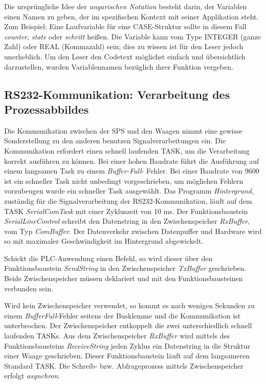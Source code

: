 Die ursprüngliche Idee der \textit{ungarischen Notation} besteht darin, der Variablen einen Namen zu geben, der  im spezifischen Kontext mit seiner Applikation steht. Zum Beispiel: Eine Laufvariable für eine CASE-Struktur sollte in diesem Fall \textit{counter}, \textit{state} oder \textit{schritt} heißen. Die Variable kann vom Type INTEGER (ganze Zahl) oder REAL (Kommazahl) sein; dies zu wissen ist für den Leser jedoch unerheblich. 
Um den Leser den Codetext möglichst einfach und übersichtlich darzustellen, wurden Variablennamen bezüglich ihrer Funktion vergeben.

\subsection{RS232-Kommunikation: Verarbeitung des Prozessabbildes}
\label{subsec:RS-232}

Die Kommunikation zwischen der SPS und den Waagen nimmt eine gewisse Sonderstellung zu den anderen benutzen Signalverarbeitungen ein. Die Kommunikation erfordert einen schnell laufenden TASK, um die Verarbeitung korrekt ausführen zu können. Bei einer hohen Baudrate führt die Ausführung auf einem langsamen Task zu einem \textit{Buffer-Full}- Fehler. Bei einer Baudrate von 9600 ist ein schneller Task nicht unbedingt vorgeschrieben, um möglichen Fehlern vorzubeugen wurde ein schneller Task ausgewählt. Das Programm \textit{Hintergrund}, zuständig für die Signalverarbeitung der RS232-Kommunikation, läuft auf dem TASK \textit{SerialComTask} mit einer Zykluszeit von 10 ms. Der Funktionsbaustein \textit{SerialLineControl} schreibt den Datenstring in den Zwischenspeicher \textit{RxBuffer}, vom Typ \textit{ComBuffer}. Der Datenverkehr zwischen Datenpuffer und Hardware wird so mit maximaler Geschwindigkeit im Hintergrund abgewickelt.

Schickt die PLC-Anwendung einen Befehl, so wird dieser über den Funktionsbaustein \textit{SendString} in den Zwischenspeicher \textit{TxBuffer} geschrieben. Beide Zwischenspeicher müssen deklariert und mit den Funktionsbausteinen verbunden sein. 

Wird kein Zwischenspeicher verwendet, so kommt es nach wenigen Sekunden zu einem \textit{BufferFull}-Fehler seitens der Busklemme und die Kommunikation ist unterbrochen. 
Der Zwischenspeicher entkoppelt die zwei unterschiedlich schnell laufenden TASKs.
Aus dem Zwischenspeicher \textit{RxBuffer} wird mittels des Funktionsbausteins \textit{ReceiveString} jeden Zyklus ein Datenstring in die Struktur einer Waage geschrieben. Dieser Funktionsbaustein läuft auf dem langsameren Standard TASK. Die Schreib- bzw. Abfrageprozess mittels Zwischenspeicher erfolgt \textit{asynchron}.

